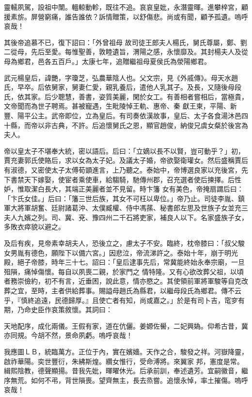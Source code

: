 \begin{pinyinscope}
 靈轜夙駕，設祖中闈。轀輬動軫，既往不追。哀哀皇妣，永潛靈暉。進攀梓宮，顧援素旂。屏營窮痛，誰告誰依？訴情贈策，以舒傷悲。尚或有聞，顧予孤遺。嗚呼哀哉！



 其後帝追慕不已，復下詔曰：「外曾祖母
 故司徒王郎夫人楊氏，舅氏尊屬，鄭、劉二從母，先后至愛。每惟聖善，敦睦遺旨，渭陽之感，永懷靡及。其封楊夫人及從母為鄉君，邑各五百戶。」太康七年，追贈繼祖母夏侯氏為滎陽鄉君。



 武元楊皇后，諱艷，字瓊芝，弘農華陰人也。父文宗，見《外戚傳》。母天水趙氏，早卒。后依舅家，舅妻仁愛，親乳養后，遣他人乳其子。及長，又隨後母段氏，依其家。后少聰慧，善書，姿質美麗，閑於女工。有善相者嘗相后，當極貴，文帝聞而為世子聘焉。甚被寵遇，生毗陵悼王軌、惠帝、秦
 獻王柬，平陽、新豐、陽平公主。武帝即位，立為皇后。有司奏依漢故事，皇后、太子各食湯沐邑四十縣，而帝以非古典，不許。后追懷舅氏之恩，顯官趙俊，納俊兄虞女粲於後宮為夫人。



 帝以皇太子不堪奉大統，密以語后。后曰：「立嫡以長不以賢，豈可動乎？」初，賈充妻郭氏使賂后，求以女為太子妃。及議太子婚，帝欲娶衛瓘女。然后盛稱賈后有淑德，又密使太子太傅荀顗進言，上乃聽之。泰始中，帝博選良家以充後宮，先下書禁天下嫁娶，使宦者乘使車，給騶騎，馳傳州郡，召充選者使后揀擇。后性妒，惟取潔白長大，其端正美麗者並不見留。時卞籓
 女有美色，帝掩扇謂后曰：「卞氏女佳。」后曰：「籓三世后族，其女不可枉以卑位。」帝乃止。司徒李胤、鎮軍大將軍胡奮、廷尉諸葛沖、太僕臧權、侍中馮蓀、秘書郎左思及世族子女並充三夫人九嬪之列。司、冀、兗、豫四州二千石將吏家，補良人以下。名家盛族子女，多敗衣瘁貌以避之。



 及后有疾，見帝素幸胡夫人，恐後立之，慮太子不安。臨終，枕帝膝曰：「叔父駿女男胤有德色，願陛下以備六宮。」因悲泣，帝流涕許之。泰始十年，崩于明光殿，絕子帝膝，時年三十七。詔曰：「皇后逮事先后，常冀能終始永奉宗廟，一旦殂隕，痛悼傷懷。每自以夙喪二親，於家門之
 情特隆。又有心欲改葬父祖，以頃者務崇儉約，初不有言，近垂困，說此意，情亦愍之。其使領前軍將軍駿等自克改葬之宜，至時，主者供給葬事。賜謚母趙氏為縣君，以繼母段氏為鄉君。傳不云乎，『慎終追遠，民德歸厚。』且使亡者有知，尚或嘉之。」於是有司卜吉，窀穸有期，乃命史臣作哀策敘懷。其詞曰：



 天地配序，成化兩儀。王假有家，道在伉儷。姜嫄佐嚳，二妃興媯。仰希古昔，冀亦同規。今胡不然，景命夙虧。嗚呼哀哉！



 我應圖ＬＢ，統臨萬方。正位于內，實在嬪嬙。天作之合，駿發之祥。河嶽降靈，啟祚華陽。奕世豐衍，朱紼斯煌。纘女惟行，受命溥將。來翼家
 邦，憲度是常。緝熙陰教，德聲顯揚。昔我先妣，暉曜休光。后承前訓，奉述遺芳。宜嗣徽音，繼序無荒。如何不弔，背世隕喪。望齊無主，長去烝嘗。追懷永悼，率土摧傷。嗚呼哀哉！




\end{pinyinscope}
